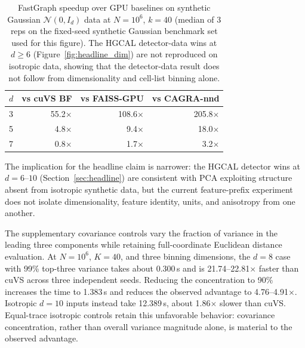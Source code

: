 \documentclass[final,3p,11pt]{elsarticle}
\begin{document}
\begin{table}[!htbp]
\centering
\caption{FastGraph speedup over GPU baselines on synthetic Gaussian
$\mathcal{N}(0, I_d)$ data at $N{=}10^6$, $k{=}40$ (median of
3 reps on the fixed-seed synthetic Gaussian benchmark set used
for this figure). The HGCAL detector-data wins at $d \geq 6$
(Figure~\ref{fig:headline_dim}) are not reproduced on isotropic
data, showing that the detector-data result does not follow from
dimensionality and cell-list binning alone.}
\label{tab:synth-dim}
\begin{tabular}{lrrr}
\toprule
$d$ & vs cuVS BF & vs FAISS-GPU & vs CAGRA-nnd \\
\midrule
3 & 55.2$\times$ & 108.6$\times$ & 205.8$\times$ \\
5 &  4.8$\times$ &   9.4$\times$ &  18.0$\times$ \\
7 &  0.8$\times$ &   1.7$\times$ &   3.2$\times$ \\
\bottomrule
\end{tabular}
\end{table}

The implication for the headline claim is narrower: the HGCAL detector
wins at $d{=}6$--$10$ (Section~\ref{sec:headline}) are consistent with
PCA exploiting structure absent from isotropic synthetic data, but the
current feature-prefix experiment does not isolate dimensionality,
feature identity, units, and anisotropy from one another.

The supplementary covariance controls vary the fraction of variance in
the leading three components while retaining full-coordinate Euclidean
distance evaluation. At $N{=}10^6$, $K{=}40$, and three binning dimensions,
the $d{=}8$ case with 99\% top-three variance takes about 0.300\,s and is
21.74--22.81$\times$ faster than cuVS across three independent seeds.
Reducing the concentration to 90\% increases the time to 1.383\,s and
reduces the observed advantage to 4.76--4.91$\times$.
Isotropic $d{=}10$ inputs instead take 12.389\,s, about
1.86$\times$ slower than cuVS. Equal-trace isotropic controls retain
this unfavorable behavior: covariance concentration, rather than overall
variance magnitude alone, is material to the observed advantage.
\end{document}
